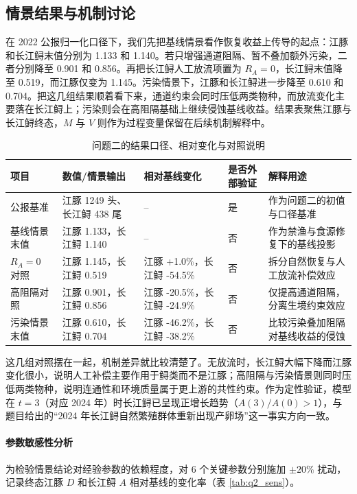 \documentclass{MMCStyle}
\begin{document}
\subsection{情景结果与机制讨论}
在 2022 公报归一化口径下，我们先把基线情景看作恢复收益上传导的起点：江豚和长江鲟末值分别为 1.133 和 1.140。若只增强通道阻隔、暂不叠加额外污染，二者分别降至 0.901 和 0.856。再把长江鲟人工放流项置为 $R_A=0$，长江鲟末值降至 0.519，而江豚仅变为 1.145。污染情景下，江豚和长江鲟进一步降至 0.610 和 0.704。把这几组结果顺着看下来，通道约束会同时压低两类物种，而放流变化主要落在长江鲟上；污染则会在高阻隔基础上继续侵蚀基线收益。结果表聚焦江豚与长江鲟终态，$M$ 与 $V$ 则作为过程变量保留在后续机制解释中。
\begin{table}[htbp]
\centering
\caption{问题二的结果口径、相对变化与对照说明}
\label{tab:q2_result}
\begin{tabularx}{0.95\textwidth}{>{\raggedright\arraybackslash}p{2.2cm} >{\raggedright\arraybackslash}p{3.6cm} >{\raggedright\arraybackslash}p{2.8cm} >{\raggedright\arraybackslash}p{1.7cm} X}
\toprule
项目 & 数值/情景输出 & 相对基线变化 & 是否外部验证 & 解释用途 \\
\midrule
2022 公报基准 & 江豚 1249 头、长江鲟 438 尾 & -- & 是 & 作为问题二的初值与口径基准 \\
基线情景末值 & 江豚 1.133，长江鲟 1.140 & -- & 否 & 作为禁渔与食源修复下的基线投影 \\
$R_A=0$ 对照 & 江豚 1.145，长江鲟 0.519 & 江豚 +1.0\%，长江鲟 -54.5\% & 否 & 拆分自然恢复与人工放流补偿效应 \\
高阻隔对照 & 江豚 0.901，长江鲟 0.856 & 江豚 -20.5\%，长江鲟 -24.9\% & 否 & 仅提高通道阻隔，分离生境约束效应 \\
污染情景末值 & 江豚 0.610，长江鲟 0.704 & 江豚 -46.2\%，长江鲟 -38.2\% & 否 & 比较污染叠加阻隔对基线收益的侵蚀 \\
\bottomrule
\end{tabularx}
\end{table}
这几组对照摆在一起，机制差异就比较清楚了。无放流时，长江鲟大幅下降而江豚变化很小，说明人工补偿主要作用于鲟类而不是江豚；高阻隔与污染情景则同时压低两类物种，说明连通性和环境质量属于更上游的共性约束。作为定性验证，模型在 $t=3$（对应 2024 年）时长江鲟已呈现正增长趋势（$A(3)/A(0)>1$），与题目给出的“2024 年长江鲟自然繁殖群体重新出现产卵场”这一事实方向一致。

\paragraph{参数敏感性分析}
为检验情景结论对经验参数的依赖程度，对 6 个关键参数分别施加 $\pm 20\%$ 扰动，记录终态江豚 $D$ 和长江鲟 $A$ 相对基线的变化率（表 \ref{tab:q2_sens}）。
\end{document}
